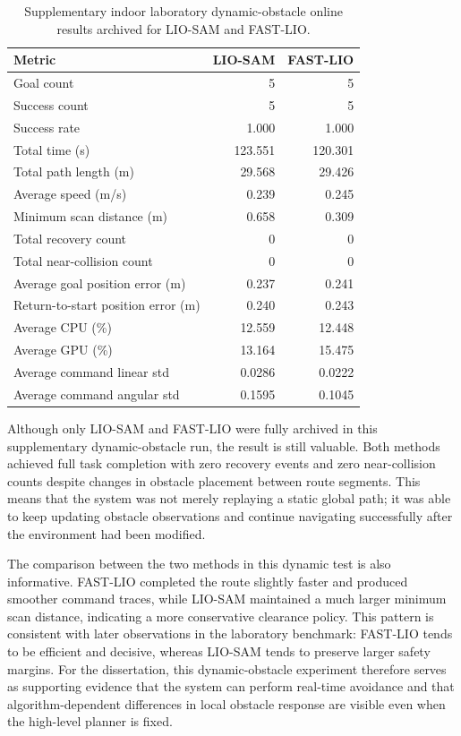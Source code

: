 \documentclass[12pt,a4paper]{report}
\begin{document}
\begin{table}[H]
\centering
\small
\setlength{\tabcolsep}{5pt}
\caption{Supplementary indoor laboratory dynamic-obstacle online results archived for LIO-SAM and FAST-LIO.}
\label{tab:online-summary-lab-dynamic}
\begin{tabular}{lrr}
\toprule
Metric & LIO-SAM & FAST-LIO \\
\midrule
Goal count & 5 & 5 \\
Success count & 5 & 5 \\
Success rate & 1.000 & 1.000 \\
Total time (s) & 123.551 & 120.301 \\
Total path length (m) & 29.568 & 29.426 \\
Average speed (m/s) & 0.239 & 0.245 \\
Minimum scan distance (m) & 0.658 & 0.309 \\
Total recovery count & 0 & 0 \\
Total near-collision count & 0 & 0 \\
Average goal position error (m) & 0.237 & 0.241 \\
Return-to-start position error (m) & 0.240 & 0.243 \\
Average CPU (\%) & 12.559 & 12.448 \\
Average GPU (\%) & 13.164 & 15.475 \\
Average command linear std & 0.0286 & 0.0222 \\
Average command angular std & 0.1595 & 0.1045 \\
\bottomrule
\end{tabular}
\end{table}

Although only LIO-SAM and FAST-LIO were fully archived in this supplementary dynamic-obstacle run, the result is still valuable. Both methods achieved full task completion with zero recovery events and zero near-collision counts despite changes in obstacle placement between route segments. This means that the system was not merely replaying a static global path; it was able to keep updating obstacle observations and continue navigating successfully after the environment had been modified.

The comparison between the two methods in this dynamic test is also informative. FAST-LIO completed the route slightly faster and produced smoother command traces, while LIO-SAM maintained a much larger minimum scan distance, indicating a more conservative clearance policy. This pattern is consistent with later observations in the laboratory benchmark: FAST-LIO tends to be efficient and decisive, whereas LIO-SAM tends to preserve larger safety margins. For the dissertation, this dynamic-obstacle experiment therefore serves as supporting evidence that the system can perform real-time avoidance and that algorithm-dependent differences in local obstacle response are visible even when the high-level planner is fixed.
\end{document}
